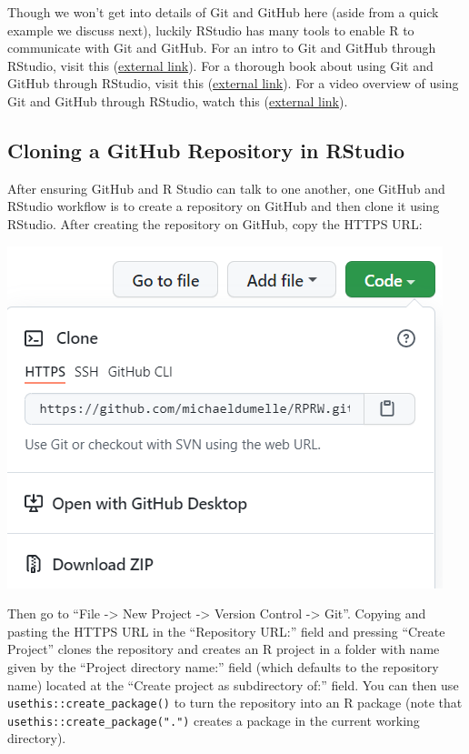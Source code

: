 \documentclass[
]{book}
\begin{document}
Though we won't get into details of Git and GitHub here (aside from a quick example we discuss next), luckily RStudio has many tools to enable R to communicate with Git and GitHub. For an intro to Git and GitHub through RStudio, visit this (\href{https://r-pkgs.org/git.html}{external link}). For a thorough book about using Git and GitHub through RStudio, visit this (\href{https://happygitwithr.com/}{external link}). For a video overview of using Git and GitHub through RStudio, watch this (\href{https://www.rstudio.com/resources/rstudioconf-2017/happy-git-and-gihub-for-the-user-tutorial/}{external link}).

\hypertarget{cloning-a-github-repository-in-rstudio}{%
\subsection{Cloning a GitHub Repository in RStudio}\label{cloning-a-github-repository-in-rstudio}}

After ensuring GitHub and R Studio can talk to one another, one GitHub and RStudio workflow is to create a repository on GitHub and then clone it using RStudio. After creating the repository on GitHub, copy the HTTPS URL:

\includegraphics[width=1\linewidth]{images/newrpack_github1}

Then go to ``File -\textgreater{} New Project -\textgreater{} Version Control -\textgreater{} Git''. Copying and pasting the HTTPS URL in the ``Repository URL:'' field and pressing ``Create Project'' clones the repository and creates an R project in a folder with name given by the ``Project directory name:'' field (which defaults to the repository name) located at the ``Create project as subdirectory of:'' field. You can then use \texttt{usethis::create\_package()} to turn the repository into an R package (note that \texttt{usethis::create\_package(".")} creates a package in the current working directory).
\end{document}
